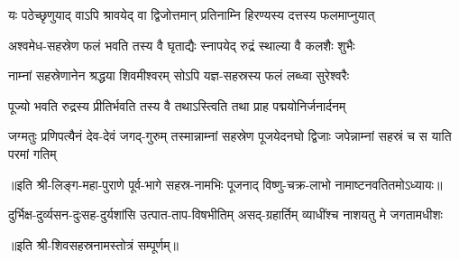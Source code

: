 \twolineshloka
{यः पठेच्छृणुयाद् वाऽपि श्रावयेद् वा द्विजोत्तमान्}
{प्रतिनाम्नि हिरण्यस्य दत्तस्य फलमाप्नुयात्}%

\twolineshloka
{अश्वमेध-सहस्रेण फलं भवति तस्य वै}
{घृताद्यैः स्नापयेद् रुद्रं स्थाल्या वै कलशैः शुभैः}%

\twolineshloka
{नाम्नां सहस्रेणानेन श्रद्धया शिवमीश्वरम्}
{सोऽपि यज्ञ-सहस्रस्य फलं लब्ध्वा सुरेश्वरैः}%

\twolineshloka
{पूज्यो भवति रुद्रस्य प्रीतिर्भवति तस्य वै}
{तथाऽस्त्विति तथा प्राह पद्मयोनिर्जनार्दनम्}%

\threelineshloka
{जग्मतुः प्रणिपत्यैनं देव-देवं जगद्-गुरुम्} 
{तस्मान्नाम्नां सहस्रेण पूजयेदनघो द्विजाः}
{जपेन्नाम्नां सहस्रं च स याति परमां गतिम्}%


{॥इति श्री-लिङ्ग-महा-पुराणे पूर्व-भागे सहस्र-नामभिः पूजनाद् विष्णु-चक्र-लाभो नामाष्टनवतितमोऽध्यायः॥}%



{दुर्भिक्ष-दुर्व्यसन-दुःसह-दुर्यशांसि}
{उत्पात-ताप-विषभीतिम् असद्‌-ग्रहार्तिम्}
{व्याधींश्च नाशयतु मे जगतामधीशः}

॥इति श्री-शिवसहस्रनामस्तोत्रं सम्पूर्णम्॥